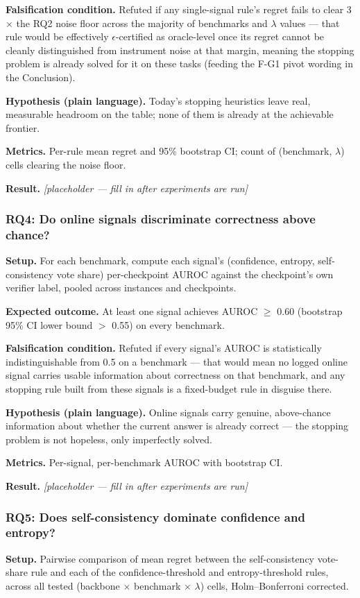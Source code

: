 \documentclass[11pt]{article}
\newcommand{\ph}{\textit{[placeholder --- fill in after experiments are run]}}
\begin{document}
\textbf{Falsification condition.} Refuted if any single-signal rule's regret fails to clear 3$\times$ the RQ2 noise floor across the majority of benchmarks and $\lambda$ values --- that rule would be effectively $\epsilon$-certified as oracle-level once its regret cannot be cleanly distinguished from instrument noise at that margin, meaning the stopping problem is already solved for it on these tasks (feeding the F-G1 pivot wording in the Conclusion).

\textbf{Hypothesis (plain language).} Today's stopping heuristics leave real, measurable headroom on the table; none of them is already at the achievable frontier.

\textbf{Metrics.} Per-rule mean regret and 95\% bootstrap CI; count of (benchmark, $\lambda$) cells clearing the noise floor.

\textbf{Result.} \ph

\subsubsection{RQ4: Do online signals discriminate correctness above chance?}
\textbf{Setup.} For each benchmark, compute each signal's (confidence, entropy, self-consistency vote share) per-checkpoint AUROC against the checkpoint's own verifier label, pooled across instances and checkpoints.

\textbf{Expected outcome.} At least one signal achieves AUROC $\geq$ 0.60 (bootstrap 95\% CI lower bound $>$ 0.55) on every benchmark.

\textbf{Falsification condition.} Refuted if every signal's AUROC is statistically indistinguishable from 0.5 on a benchmark --- that would mean no logged online signal carries usable information about correctness on that benchmark, and any stopping rule built from these signals is a fixed-budget rule in disguise there.

\textbf{Hypothesis (plain language).} Online signals carry genuine, above-chance information about whether the current answer is already correct --- the stopping problem is not hopeless, only imperfectly solved.

\textbf{Metrics.} Per-signal, per-benchmark AUROC with bootstrap CI.

\textbf{Result.} \ph

\subsubsection{RQ5: Does self-consistency dominate confidence and entropy?}
\textbf{Setup.} Pairwise comparison of mean regret between the self-consistency vote-share rule and each of the confidence-threshold and entropy-threshold rules, across all tested (backbone $\times$ benchmark $\times$ $\lambda$) cells, Holm--Bonferroni corrected.
\end{document}
